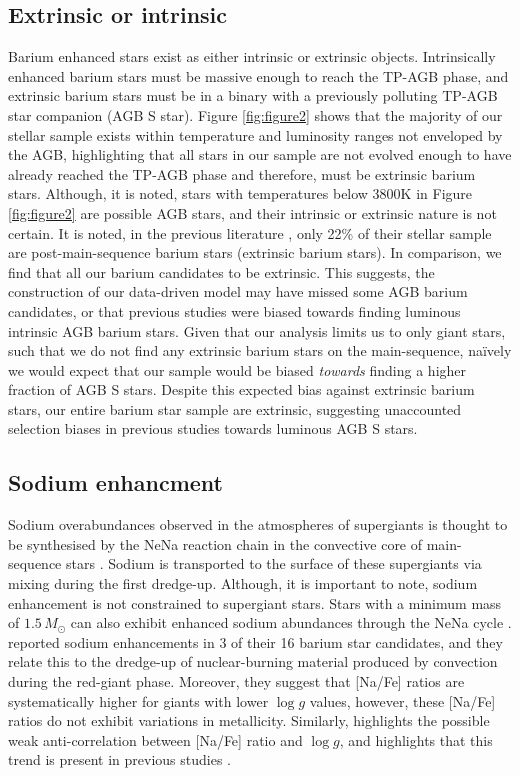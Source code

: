 \documentclass[a4paper,fleqn,usenatbib]{mnras}
\begin{document}
\subsection{Extrinsic or intrinsic}
Barium enhanced stars exist as either intrinsic or extrinsic objects. Intrinsically enhanced barium stars must be massive enough to reach the TP-AGB phase, and extrinsic barium stars must be in a binary with a previously polluting TP-AGB star companion (AGB S star). Figure \ref{fig:figure2} shows that the majority of our stellar sample exists within temperature and luminosity ranges not enveloped by the AGB, highlighting that all stars in our sample are not evolved enough to have already reached the TP-AGB phase and therefore, must be extrinsic barium stars. Although, it is noted, stars with temperatures below 3800K in Figure \ref{fig:figure2} are possible AGB stars, and their intrinsic or extrinsic nature is not certain. It is noted, in the previous literature \citep{van2017}, only 22\% of their stellar sample are post-main-sequence barium stars (extrinsic barium stars). In comparison, we find that all our barium candidates to be extrinsic. This suggests, the construction of our data-driven model may have missed some AGB barium candidates, or that previous studies were biased towards finding luminous intrinsic AGB barium stars. Given that our analysis limits us to only giant stars, such that we do not find any extrinsic barium stars on the main-sequence, na\"ively we would expect that our sample would be biased \emph{towards} finding a higher fraction of AGB S stars. Despite this expected bias against extrinsic barium stars, our entire barium star sample are extrinsic, suggesting unaccounted selection biases in previous studies towards luminous AGB S stars.


\subsection{Sodium enhancment}
Sodium overabundances observed in the atmospheres of supergiants is thought to be synthesised by the NeNa reaction chain in the convective core of main-sequence stars \citep{el1995}. Sodium is transported to the surface of these supergiants via mixing during the first dredge-up. Although, it is important to note, sodium enhancement is not constrained to supergiant stars. Stars with a  minimum mass of $1.5\,M_\odot$ can also exhibit enhanced sodium abundances through the NeNa cycle \citep{denissenkov1987}. \citet{antipova2004} reported sodium enhancements in 3 of their 16 barium star candidates, and they relate this to the dredge-up of nuclear-burning material produced by convection during the red-giant phase. Moreover, they suggest that [Na/Fe] ratios are systematically higher for giants with lower $\log{g}$ values, however, these [Na/Fe] ratios do not exhibit variations in metallicity. Similarly, \citet{decastro2016} highlights the possible weak anti-correlation between [Na/Fe] ratio and $\log{g}$, and highlights that this trend is present in previous studies \citep[e.g.,][]{boyarchuk2002,mishenina2006,luck2007,takeda2008}.
\end{document}
